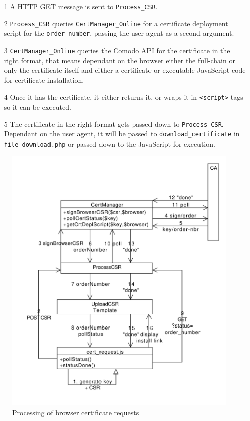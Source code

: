 \documentclass{scrartcl}
\begin{document}
\begin{enumerate}
	\item[1] A HTTP GET message is sent to \verb+Process_CSR+.
	\item[2] \verb+Process_CSR+ queries \verb+CertManager_Online+ for a certificate deployment script for the \verb+order_number+, passing the user agent as a second argument.
	\item[3] \verb+CertManager_Online+ queries the Comodo API for the certificate in the right format, that means dependant on the browser either the full-chain or only the certificate itself and either a certificate or executable JavaScript code for certificate installation.
	\item[4] Once it has the certificate, it either returns it, or wraps it in \verb+<script>+ tags so it can be executed.
	\item[5] The certificate in the right format gets passed down to \verb+Process_CSR+. Dependant on the user agent, it will be passed to \verb+download_certificate+ in \verb+file_download.php+ or passed down to the JavaScript for execution.
\end{enumerate}

\begin{figure}\label{fig_browser_process}
	\begin{center}
	\includegraphics[width=\textwidth]{browser_process_cert}
	\caption{Processing of browser certificate requests}
	\end{center}
\end{figure}
\end{document}
